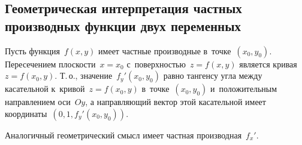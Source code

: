 \subsection{Геометрическая интерпретация частных производных функции двух переменных}
Пусть функция~$f(x, y)$ имеет частные производные в~точке~$(x_0, y_0)$.
Пересечением плоскости~$x = x_0$ с~поверхностью~$z = f(x, y)$ является кривая~$z = f(x_0, y)$.
Т.\,о., значение~$f_y'(x_0, y_0)$ равно тангенсу угла между касательной к~кривой~$z = f(x_0, y)$ в~точке~$(x_0, y_0)$ и~положительным направлением оси~$Oy$, а направляющий вектор этой касательной имеет координаты~$(0, 1, f_y'(x_0, y_0))$.

Аналогичный геометрический смысл имеет частная производная~$f_x'$.